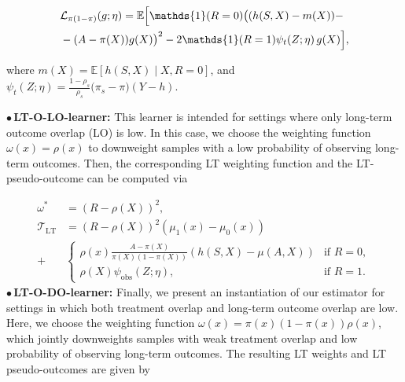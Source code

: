 \documentclass{article}
\theoremstyle{plain}
\theoremstyle{definition}
\theoremstyle{remark}
\newcommand{\E}{\mathbb{E}}                %
\newcommand{\1}{\mathds{1}}                %
\newcommand{\LO}{LT-O-LO-learner\xspace}
\newcommand{\DO}{LT-O-DO-learner\xspace}
\begin{document}
\vspace{-0.5cm}
\footnotesize
\begin{align}
\label{t-learner-loss}
 & \mathcal{L}_{\pi(1-\pi)}(g;\eta)=\mathbb{E}\Bigl[ \1(R=0)\bigl((h(S,X)-m(X))- \\
& -(A -\pi(X))g(X)\bigr)^2 - 2\1(R=1)\psi_{t}(Z;\eta)\,g(X)\Bigr] \notag ,
\end{align}
\vspace{-0.5cm}
\normalsize

where $m(X)=\E\left[h(S,X) \mid X,R=0\right]$, and $ \psi_{t}(Z;\eta)= \frac{1-\rho_s}{\rho_s} \bigl(\pi_s-\pi\bigr)(Y-h).$


$\bullet$\,\textbf{\LO: } This learner is intended for settings where only long-term outcome overlap (LO) is low. In this case, we choose the weighting function $\omega(x)=\rho(x)$ to downweight samples with a low probability of observing long-term outcomes. Then, the corresponding LT weighting function and the LT-pseudo-outcome can be computed via

\vspace{-0.5cm}
\footnotesize
\begin{align*}
\omega^* &= (R-\rho(X))^2,\\
    \mathcal{T}_\mathrm{LT}&= (R-\rho(X))^2 (\mu_1(x) - \mu_0(x)) \\
    +& \begin{cases} 
     \rho(x)\frac{A-\pi(X)}{\pi(X)(1-\pi(X))}(h(S,X) - \mu(A,X)) & \text{if } R=0,\\
     \rho(X)\psi_\mathrm{obs}(Z;\eta) , & \text{if } R=1 .
   \end{cases}
\end{align*}
\normalsize
$\bullet$\,\textbf{\DO:} Finally, we present an instantiation of our estimator for settings in which both treatment overlap and long-term outcome overlap are low. Here, we choose the weighting function $\omega(x)=\pi(x)(1-\pi(x))\rho(x)$, which jointly downweights samples with weak treatment overlap and low probability of observing long-term outcomes. The resulting LT weights and LT pseudo-outcomes are given by
\end{document}
